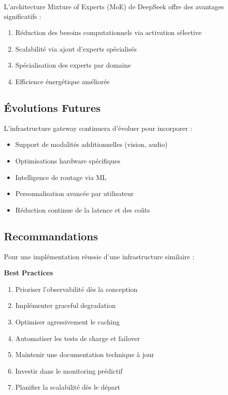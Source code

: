 \documentclass[12pt,a4paper]{article}
\begin{document}
L'architecture Mixture of Experts (MoE) de DeepSeek offre des avantages significatifs :

\begin{enumerate}[noitemsep]
    \item Réduction des besoins computationnels via activation sélective
    \item Scalabilité via ajout d'experts spécialisés
    \item Spécialisation des experts par domaine
    \item Efficience énergétique améliorée
\end{enumerate}

\subsection{Évolutions Futures}

L'infrastructure gateway continuera d'évoluer pour incorporer :
\begin{itemize}[noitemsep]
    \item Support de modalités additionnelles (vision, audio)
    \item Optimisations hardware spécifiques
    \item Intelligence de routage via ML
    \item Personnalisation avancée par utilisateur
    \item Réduction continue de la latence et des coûts
\end{itemize}

\subsection{Recommandations}

Pour une implémentation réussie d'une infrastructure similaire :

\begin{tcolorbox}[colback=green!5, colframe=green!50!black]
\textbf{Best Practices}
\begin{enumerate}[noitemsep]
    \item Prioriser l'observabilité dès la conception
    \item Implémenter graceful degradation
    \item Optimiser agressivement le caching
    \item Automatiser les tests de charge et failover
    \item Maintenir une documentation technique à jour
    \item Investir dans le monitoring prédictif
    \item Planifier la scalabilité dès le départ
\end{enumerate}
\end{tcolorbox}
\end{document}
